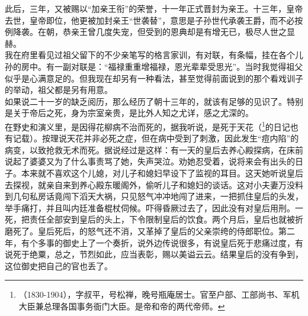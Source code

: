   此后，三年，又被赐以“加亲王衔”的荣誉，十一年正式晋封为亲王。十三年，皇帝去世，皇帝即位，他更被加封亲王“世袭替”，意思是子孙世代承袭王爵，而不必按例降袭。在朝，恭亲王曾几度失宠，但受到的恩典却是有增无已，极尽人世之显赫。\\

  我在府里看见过祖父留下的不少亲笔写的格言家训，有对联，有条幅，挂在各个儿孙的房中。有一副对联是：“福禄重重增福禄，恩光辈辈受思光”。当时我觉得祖父似乎是心满意足的。但我现在却另有一种看法，甚至觉得前面说到的那个看戏训子的举动，祖父都是另有用意。\\

  如果说二十一岁的缺乏阅历，那么经历了朝十三年的，就该有足够的见识了。特别是关于帝后之死，身为宗室亲贵，是比外人知之尤详，感之尤深的。\\

  在野史和演义里，是因得花柳病不治而死的，据我听说，是死于天花（\footnote{（1830-1904），字叔平，号松禅，晚号瓶庵居士。官至户部、工部尚书、军机大臣兼总理各国事务衙门大臣。是帝和帝的两代帝师。}的日记也有记载）。按理说天花并非必死之症，但在病中受到了刺激，因此发生“痘内陷”的病变，以致抢救无术而死。据说经过是这样：有一天的皇后去养心殿探病，在床前说起了婆婆又为了什么事责骂了她，失声哭泣。劝她忍受着，说将来会有出头的日子。本来就不喜欢这个儿媳，对儿子和媳妇早设下了监视的耳目。这天她听说皇后去探视，就亲自来到养心殿东暖阁外，偷听儿子和媳妇的谈话。这对小夫妻万没料到几句私房话竟闯下滔天大祸，只见怒气冲冲地闯了进来，一把抓住皇后的头发，举手痛打，并且叫内廷准备棍杖伺候。吓得昏厥过去了，因此没有对皇后用刑。一死，把责任全部安到皇后的头上，下令限制皇后的饮食。两个月后，皇后也就被折磨死了。皇后死后，的怒气还不消，又革掉了皇后的父亲崇绔的侍郎职位。第二年，有个多事的御史上了一个奏折，说外边传说很多，有说皇后死于悲痛过度，有说死于绝粟，总之，节烈如此，应当表彰，赐以美谥云云。结果皇后的没有争到，这位御史把自己的官也丢了。\\

